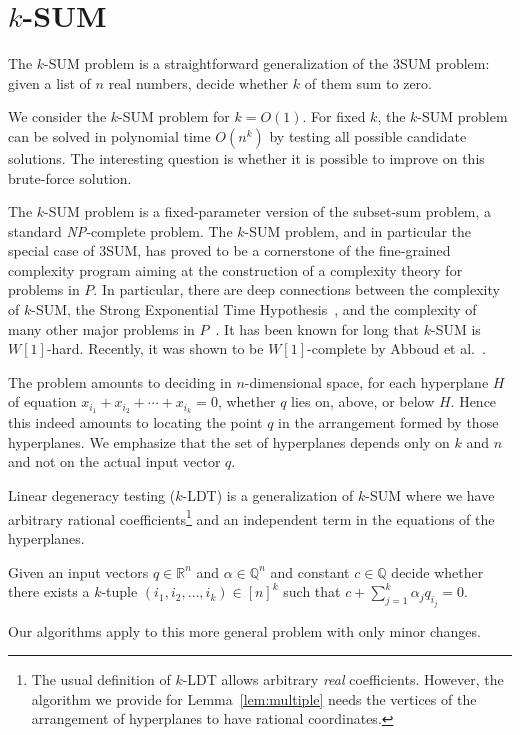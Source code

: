 \chapter{\(k\)-SUM}


The \(k\)-SUM problem is a straightforward generalization of the 3SUM problem:
given a list of \(n\) real numbers, decide whether \(k\) of them sum to zero.



We consider the \(k\)-SUM problem for \(k=O(1)\).
For fixed \(k\), the \(k\)-SUM problem can be solved in polynomial time
\(O(n^k)\) by testing all possible candidate solutions.
The interesting question is whether it is possible to improve on
this brute-force solution.

The \(k\)-SUM problem is a fixed-parameter version of the subset-sum problem, a
standard \textit{NP}-complete problem. The \(k\)-SUM problem, and in particular
the special case of 3SUM, has proved to be a cornerstone of the fine-grained
complexity program aiming at the construction of a complexity theory for
problems in $P$. In particular, there are deep connections between the
complexity of \(k\)-SUM, the Strong Exponential Time
Hypothesis~\cite{PW10,CGIMPS15}, and the complexity of many other major
problems in
$P$~\cite{GO95,BH99,MO01,P10,ACLL14,AVW14,GP18,KPP14,ALW14,AWY15,CL15}.
It has been known for long that \(k\)-SUM is $W[1]$-hard. Recently, it was shown
to be $W[1]$-complete by Abboud et al.~\cite{ALW14}.

The problem amounts to deciding in $n$-dimensional space, for each hyperplane
\(H\) of equation \(x_{i_1} + x_{i_2} + \cdots +x_{i_k} = 0\), whether \(q\)
lies on, above, or below \(H\). Hence this indeed amounts to locating the point
$q$ in the arrangement formed by those hyperplanes. We emphasize that the set
of hyperplanes depends only on $k$ and $n$ and not on the actual input vector
$q$.

Linear degeneracy testing (\(k\)-LDT) is a generalization of \(k\)-SUM where we
have arbitrary rational coefficients\footnote{The usual definition of \(k\)-LDT
allows arbitrary \emph{real} coefficients. However, the algorithm we provide
for Lemma~\ref{lem:multiple} needs the vertices of the arrangement of
hyperplanes to have rational coordinates.}
and an independent term in the equations
of the hyperplanes.
\begin{problem}[\(k\)-LDT]
 Given an input vectors \(q\in\mathbb{R}^n\) and
 $\alpha \in \mathbb{Q}^n$ and constant $c \in \mathbb{Q}$
 decide whether there exists a
 $k$-tuple \((i_1, i_2,\ldots ,i_k) \in {[n]}^k\) such that
 \(c + \sum_{j=1}^k \alpha_j q_{i_j} = 0\).
 \end{problem}
Our algorithms apply to this more general problem with only minor changes.

